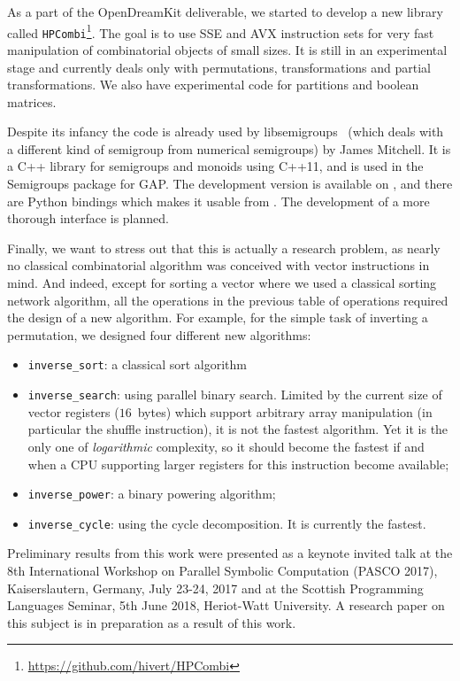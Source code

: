 \documentclass{deliverablereport}
\begin{document}
As a part of the OpenDreamKit deliverable, we started to develop a new
library called \texttt{HPCombi}\footnote{\url{https://github.com/hivert/HPCombi}}. The
goal is to use SSE and AVX instruction sets for very fast manipulation of
combinatorial objects of small sizes. It is still in an experimental stage and
currently deals only with permutations, transformations and partial
transformations. We also have experimental code for partitions and boolean
matrices.

Despite its infancy the code is already used by
libsemigroups~\cite{libsemigroups} (which deals with a different kind of
semigroup from numerical semigroups) by James Mitchell. It is a C++ library
for semigroups and monoids using C++11, and is used in the Semigroups package
for GAP. The development version is available on \GitHub, and there are Python
bindings which makes it usable from \Sage. The development of a more thorough
\Sage interface is planned.  \bigskip

Finally, we want to stress out that this is actually a research
problem, as nearly no classical combinatorial algorithm was conceived 
with vector instructions in mind. And indeed, except for sorting a vector where we used 
a classical sorting network algorithm, all the operations in the previous table of 
operations required the design of a new algorithm. For example, for the
simple task of inverting a permutation, we designed four different new
algorithms:
\begin{itemize}
\item \verb|inverse_sort|:  a classical sort algorithm
\item \verb|inverse_search|:  using parallel binary
  search. Limited by the current size of vector registers ($16$~bytes) which support
  arbitrary array manipulation (in particular the shuffle instruction), it is
  not the fastest algorithm. Yet it is the only one of {\em logarithmic} complexity,
  so it should become the fastest if and when a CPU supporting larger registers
  for this instruction become available;
\item \verb|inverse_power|: a binary powering algorithm;
\item \verb|inverse_cycle|: using the cycle decomposition. It is currently the fastest.
\end{itemize}
Preliminary results from this work were presented as a keynote invited talk at
the 8th International Workshop on Parallel Symbolic Computation (PASCO 2017),
Kaiserslautern, Germany, July 23-24, 2017 and at the Scottish Programming
Languages Seminar, 5th June 2018, Heriot-Watt University. A research paper on
this subject is in preparation as a result of this work.
\end{document}
